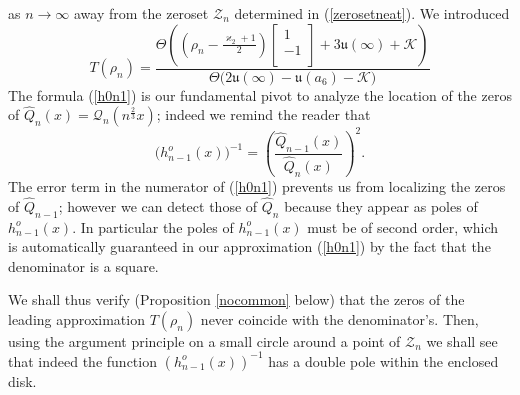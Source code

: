 \documentclass[10pt,oneside,reqno]{amsart}
\numberwithin{equation}{section}
\def\le{\left}
\def\ri{\right}
\def\be{\begin{equation}}
\def\ee{\end{equation}}
\def\wh{\widehat}
\def\eqref#1{(\ref{#1})}
\begin{document}
as $n\rightarrow\infty$ away from the zeroset $\mathcal{Z}_n$ determined in \eqref{zerosetneat}. We introduced 
\begin{equation}\label{Teq}
 T(\rho_n) = \frac{\Theta\left(
 \le(\rho_n - \frac {\varkappa_2+1}2\ri) \begin{bmatrix}
                      1\\
-1\\
                     \end{bmatrix}+3\mathfrak{u}(\infty)+\mathcal{K}
                     \right)}{\Theta\big(2\mathfrak{u}(\infty)-\mathfrak{u}(a_6)-\mathcal{K}\big)}
\end{equation}
The formula \eqref{h0n1} is our fundamental pivot to analyze the location of the zeros of $\wh Q_n (x) =\mathcal Q_n(n^\frac  23 x)$; indeed we remind the reader that 
\be
 \big(h_{n-1}^o(x)\big)^{-1} = \le(\frac {\wh Q_{n-1}(x)}{\wh Q_n(x)}\ri)^2.
\ee
The error term in the numerator of \eqref{h0n1} prevents us from localizing the zeros of $\wh Q_{n-1}$; however we can detect those of $\wh Q_n$ because they appear as poles of $h^o_{n-1}(x)$. In particular the poles of $h^o_{n-1}(x)$ must be of second order, which is automatically guaranteed in our approximation \eqref{h0n1} by the fact that the denominator is a square.

We shall thus verify (Proposition \ref{nocommon} below) that the zeros of the leading approximation $T(\rho_n)$ never coincide with the denominator's. Then, using the argument principle on a small circle around a point of $\mathcal Z_n$ we shall see that indeed the function $(h^o_{n-1}(x))^{-1}$ has a double pole within the enclosed disk.


\end{document}
